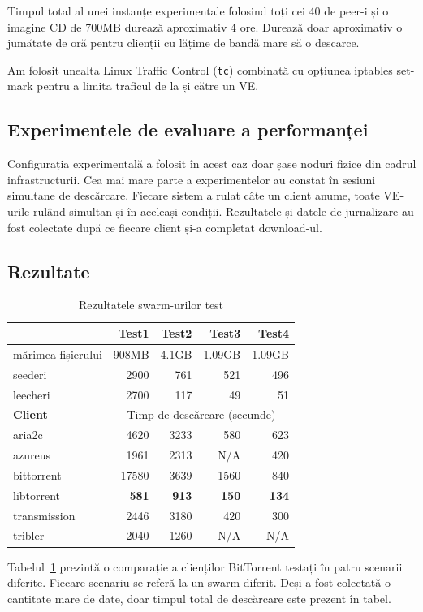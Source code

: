Timpul total al unei instanțe experimentale folosind toți cei 40 de peer-i
și o imagine CD de 700MB durează aproximativ 4 ore. Durează doar aproximativ
o jumătate de oră pentru clienții cu lățime de bandă mare să o descarce.

Am folosit unealta Linux Traffic Control (\texttt{tc}) combinată cu
opțiunea iptables set-mark pentru a limita traficul de la și către un VE.

\subsection{Experimentele de evaluare a performanței}

Configurația experimentală a folosit în acest caz doar șase noduri fizice
din cadrul infrastructurii. Cea mai mare parte a experimentelor au constat
în sesiuni simultane de descărcare. Fiecare sistem a rulat câte un client
anume, toate VE-urile rulând simultan și în aceleași condiții. Rezultatele
și datele de jurnalizare au fost colectate după ce fiecare client și-a
completat download-ul.

\subsection{Rezultate}

\begin{table}[ht]
  \centering
  \begin{tabular}{@{}lrrrr@{}}
    \toprule
    & \textbf{Test1} & \textbf{Test2} & \textbf{Test3} &
    \textbf{Test4} \\
    \midrule
    mărimea fișierului & 908MB & 4.1GB & 1.09GB & 1.09GB	\\
    seederi & 2900 & 761 & 521 & 496	\\
    leecheri & 2700 & 117 & 49 & 51	\\
    \midrule
    \textbf{Client} & \multicolumn{4}{c}{Timp de descărcare (secunde)} \\
    \midrule
    aria2c & 4620 & 3233 & 580 & 623 \\
    azureus & 1961 & 2313 & N/A & 420 \\
    bittorrent & 17580 & 3639 & 1560 & 840 \\
    libtorrent & \textbf{581} & \textbf{913} & \textbf{150} & \textbf{134} \\
    transmission & 2446 & 3180 & 420 & 300 \\
    tribler & 2040 & 1260 & N/A & N/A \\
    \bottomrule
  \end{tabular}
  \caption{Rezultatele swarm-urilor test}
  \label{table:virt-infra:testsw}
\end{table}

Tabelul~\ref{table:virt-infra:testsw} prezintă o comparație a clienților
BitTorrent testați în patru scenarii diferite. Fiecare scenariu se referă
la un swarm diferit. Deși a fost colectată o cantitate mare de date, doar
timpul total de descărcare este prezent în tabel.
